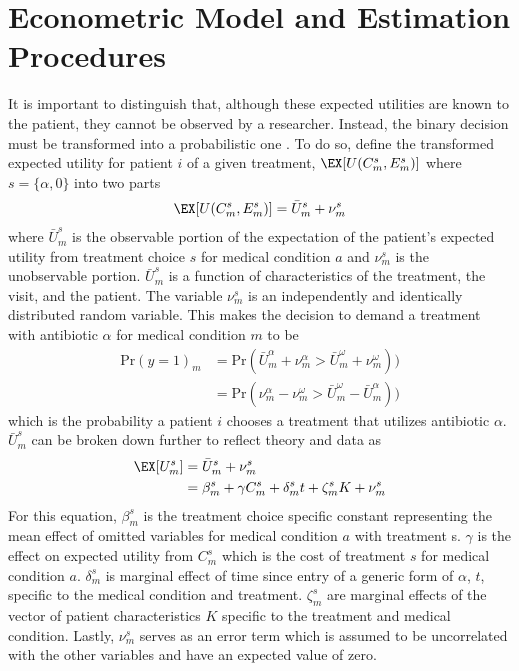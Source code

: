 \section{Econometric Model and Estimation Procedures}
\indent It is important to distinguish that, although these expected utilities are known to the patient, they cannot be observed by a researcher. Instead, the binary decision must be transformed into a probabilistic one \cite{train_discrete_nodate, templeton_household_2008}. To do so, define the transformed expected utility for patient $i$ of a given treatment, $\EX[U(C_m^s,E_m^s)]$ where $s = \{\alpha,0\}$ into two parts
\begin{eqnarray}
\EX[U(C^s_m,E^s_m)] = \bar{U}_m^s + \nu_m^s
\end{eqnarray}
where $\bar{U}_m^s$ is the observable portion of the expectation of the patient's expected utility from treatment choice $s$ for medical condition $a$ and $\nu_m^s$ is the unobservable portion. $\bar{U}_m^s$ is a function of characteristics of the treatment, the visit, and the patient. The variable $\nu_m^s$ is an independently and identically distributed random variable. This makes the decision to demand a treatment with antibiotic $\alpha$ for medical condition $m$ to be
\begin{equation}
\begin{split}\text{Pr}(y = 1)_m & = \text{Pr}(\bar{U}^\alpha_m + \nu^\alpha_m > \bar{U}^\omega_m + \nu^\omega_m))\\
  & = \text{Pr}(\nu^\alpha_m - \nu^\omega_m > \bar{U}^\omega_m - \bar{U}^\alpha_m))
\end{split}
\end{equation}which is the probability a patient $i$ chooses a treatment that utilizes antibiotic $\alpha$.\\
\indent $\bar{U}_m^s$ can be broken down further to reflect theory and data as
\begin{equation}
\begin{split}  \EX[U_m^s] & =\bar{U}_m^s + \nu_m^s\\
& = \beta_m^s + \gamma C_m^s + \delta_m^st + \zeta_m^sK + \nu_m^s
\end{split}
\end{equation}
For this equation, $\beta_m^s$ is the treatment choice specific constant representing the mean effect of omitted variables for medical condition $a$ with treatment s. $\gamma$ is the effect on expected utility from $C_m^s$ which is the cost of treatment $s$ for medical condition $a$. $\delta_m^s$ is marginal effect of time since entry of a generic form of $\alpha$, $t$, specific to the medical condition and treatment. $\zeta_m^s$ are marginal effects of the vector of patient characteristics $K$ specific to the treatment and medical condition. Lastly, $\nu_m^s$ serves as an error term which is assumed to be uncorrelated with the other variables and have an expected value of zero.\\
